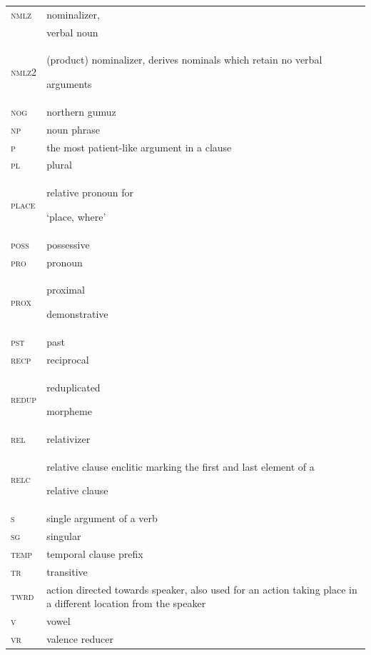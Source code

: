\documentclass[output=paper]{langsci/langscibook}
\begin{document}
\begin{tabularx}{.45\textwidth}{lX}
\textsc{nmlz}   &  nominalizer, \\
& verbal noun \\

\textsc{nmlz2 }  &  (product) nominalizer, derives nominals which retain no verbal 

arguments \\

\textsc{nog}  &  northern gumuz \\

\textsc{np}  &  noun phrase \\

\textsc{p}  &  the most patient-like argument in a clause \\

\textsc{pl}   & plural \\

\textsc{place}  &  relative pronoun for 

‘place, where’ \\

\textsc{poss}  &  possessive \\

\textsc{pro}  &  pronoun \\

\textsc{prox}  &  proximal 

demonstrative \\

\textsc{pst}  &  past \\

\textsc{recp}  &  reciprocal \\

\textsc{redup}  &  reduplicated 

morpheme \\

\textsc{rel}  &  relativizer \\

\textsc{relc} & relative clause enclitic marking the first and last element of a 

relative clause \\

\textsc{s}  &   single argument of a verb \\

\textsc{sg}  &  singular \\

\textsc{temp}  &  temporal clause prefix \\

\textsc{tr}  &   transitive \\

\textsc{twrd}  & action directed towards speaker, also used for an action taking place in a different location from the speaker \\

\textsc{v} & vowel \\

\textsc{vr} &  valence reducer \\
\end{tabularx}
\end{document}
